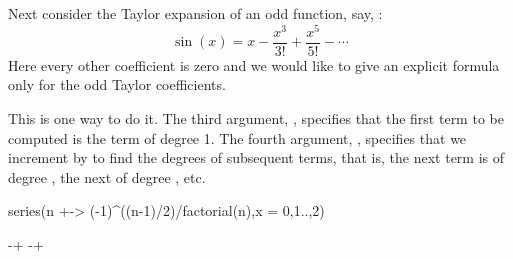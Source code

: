 {{{{{{{{{{{{{{{Next consider the Taylor expansion of an odd function, say,
:
\begin{displaymath}
\sin(x) = x - \frac{x^3}{3!} + \frac{x^5}{5!} - \cdots
\end{displaymath}
Here every other coefficient is zero and we would like to give an
explicit formula only for the odd Taylor coefficients.
%
\begin{xtc}
\begin{xtccomment}
This is one way to do it.
The third argument, , specifies that the first term to be computed
is the term of degree 1.
The fourth argument, , specifies that we
increment by  to find the degrees of subsequent terms, that is, the next
term
is of degree , the next of degree , etc.
\end{xtccomment}
\begin{spadsrc}
series(n +-> (-1)^((n-1)/2)/factorial(n),x = 0,1..,2)
\end{spadsrc}
\begin{TeXOutput}
\begin{fricasmath}{3}
-{\TIMES {}}+\TIMES %
-{\TIMES {}}+%
%
\end{fricasmath}
\end{TeXOutput}
\end{xtc}
%

}}}}}}}}}}}}}}}
